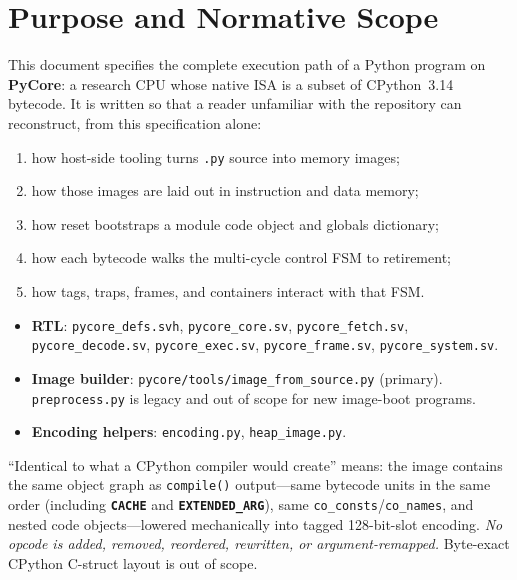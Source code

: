 \documentclass[11pt,a4paper]{article}
\newcommand{\opcode}[1]{\texttt{\textbf{#1}}}
\newcommand{\modname}[1]{\texttt{#1}}
\begin{document}
\section{Purpose and Normative Scope}
\label{sec:scope}

This document specifies the complete execution path of a Python program on
\textbf{PyCore}: a research CPU whose native ISA is a subset of CPython~3.14
bytecode. It is written so that a reader unfamiliar with the repository can
reconstruct, from this specification alone:

\begin{enumerate}[leftmargin=*]
  \item how host-side tooling turns \texttt{.py} source into memory images;
  \item how those images are laid out in instruction and data memory;
  \item how reset bootstraps a module code object and globals dictionary;
  \item how each bytecode walks the multi-cycle control FSM to retirement;
  \item how tags, traps, frames, and containers interact with that FSM.
\end{enumerate}

\begin{specbox}
\begin{itemize}[leftmargin=*,itemsep=2pt]
  \item \textbf{RTL}: \modname{pycore\_defs.svh}, \modname{pycore\_core.sv},
        \modname{pycore\_fetch.sv}, \modname{pycore\_decode.sv},
        \modname{pycore\_exec.sv}, \modname{pycore\_frame.sv},
        \modname{pycore\_system.sv}.
  \item \textbf{Image builder}: \modname{pycore/tools/image\_from\_source.py}
        (primary). \modname{preprocess.py} is legacy and out of scope for new
        image-boot programs.
  \item \textbf{Encoding helpers}: \modname{encoding.py}, \modname{heap\_image.py}.
\end{itemize}
\end{specbox}

\begin{warnbox}
``Identical to what a CPython compiler would create'' means: the image contains
the same object graph as \texttt{compile()} output---same bytecode units in the
same order (including \opcode{CACHE} and \opcode{EXTENDED\_ARG}), same
\texttt{co\_consts}/\texttt{co\_names}, and nested code objects---lowered
mechanically into tagged 128-bit-slot encoding. \emph{No opcode is added,
removed, reordered, rewritten, or argument-remapped.} Byte-exact CPython
C-struct layout is out of scope.
\end{warnbox}
\end{document}
